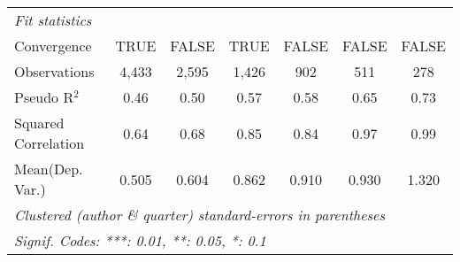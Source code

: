 \begin{tabular}{lcccccc}
   \midrule
   \emph{Fit statistics}\\
   Convergence                                                &TRUE     & FALSE   & TRUE          & FALSE         & FALSE        & FALSE\\  
   Observations                                               & 4,433   & 2,595   & 1,426         & 902           & 511          & 278\\  
   Pseudo R$^2$                                               & 0.46    & 0.50    & 0.57          & 0.58          & 0.65         & 0.73\\  
   Squared Correlation                                        & 0.64    & 0.68    & 0.85          & 0.84          & 0.97         & 0.99\\  
Mean(Dep. Var.) & 0.505 & 0.604 & 0.862 & 0.910 & 0.930 & 1.320 \\
   \midrule \midrule
   \multicolumn{7}{l}{\emph{Clustered (author \& quarter) standard-errors in parentheses}}\\
   \multicolumn{7}{l}{\emph{Signif. Codes: ***: 0.01, **: 0.05, *: 0.1}}\\
\end{tabular}
\par\endgroup
